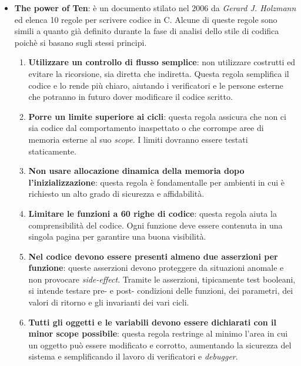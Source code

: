\begin{itemize}


\item[] \textbf{The power of Ten}: è un documento stilato nel 2006 da \textit{Gerard J. Holzmann} ed elenca 10 regole per scrivere codice in C. Alcune di queste regole sono simili a quanto già definito durante la fase di analisi dello stile di codifica poichè si basano sugli stessi principi.

\begin{enumerate}
\item \textbf{Utilizzare un controllo di flusso semplice}: non utilizzare costrutti  ed evitare la ricorsione, sia diretta che indiretta. Questa regola semplifica il codice e lo rende più chiaro, aiutando i verificatori e le persone esterne che potranno in futuro dover modificare il codice scritto.

\item \textbf{Porre un limite superiore ai cicli}: questa regola assicura che non ci sia codice dal comportamento inaspettato o che corrompe aree di memoria esterne al suo \textit{scope}. I limiti dovranno essere testati staticamente.

\item \textbf{Non usare allocazione dinamica della memoria dopo l'inizializzazione}: questa regola è fondamentalle per ambienti in cui è richiesto un alto grado di sicurezza e affidabilità. 

\item \textbf{Limitare le funzioni a 60 righe di codice}: questa regola aiuta la comprensibilità del codice. Ogni funzione deve essere contenuta in una singola pagina per garantire una buona visibilità.

\item \textbf{Nel codice devono essere presenti almeno due asserzioni per funzione}: queste asserzioni devono proteggere da situazioni anomale e non provocare \textit{side-effect}. Tramite le asserzioni, tipicamente test booleani, si intende testare pre-  e post- condizioni delle funzioni, dei parametri, dei valori di ritorno e gli invarianti dei vari cicli.

\item \textbf{Tutti gli oggetti e le variabili devono essere dichiarati con il minor scope possibile}: questa regola restringe al minimo l'area in cui un oggetto può essere modificato e corrotto, aumentando la sicurezza del sistema e semplificando il lavoro di verificatori e \textit{debugger}.


\end{enumerate}
\end{itemize}
